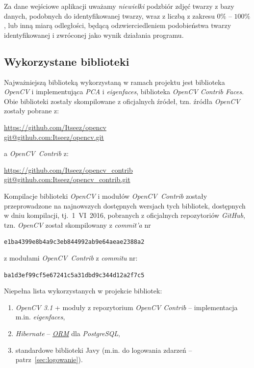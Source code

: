 \documentclass[a4paper,titlepage]{article}
\theoremstyle{break}
\numberwithin{equation}{subsection}
\begin{document}
Za dane wejściowe aplikacji uważamy \emph{niewielki} podzbiór zdjęć twarzy z bazy danych, podobnych do identyfikowanej twarzy, wraz z liczbą z zakresu $0\%$ -- $100\%$, lub inną miarą odległości, będącą odzwierciedleniem podobieństwa twarzy identyfikowanej i zwróconej jako wynik działania programu.


\subsection{Wykorzystane biblioteki}

Najważniejszą biblioteką wykorzystaną w ramach projektu jest biblioteka \emph{OpenCV} i implementująca \emph{PCA} i \emph{eigenfaces}, biblioteka \emph{OpenCV Contrib Faces}. Obie biblioteki zostały skompilowane z oficjalnych źródeł, tzn. źródła \emph{OpenCV} zostały pobrane z:
\begin{center}
\url{https://github.com/Itseez/opencv}\\
\url{git@github.com:Itseez/opencv.git}
\end{center}
a \emph{OpenCV~Contrib} z:
\begin{center}
\url{https://github.com/Itseez/opencv_contrib}\\
\url{git@github.com:Itseez/opencv_contrib.git}
\end{center}
Kompilacje biblioteki \emph{OpenCV} i modułów \emph{OpenCV~Contrib} zostały przeprowadzone na najnowszych dostępnych wersjach tych bibliotek, dostępnych w dniu kompilacji, tj.~1~VI~2016, pobranych z oficjalnych repozytoriów \emph{GitHub}, tzn. \emph{OpenCV} został skompilowany z \emph{commit'a} nr
\begin{center}
\texttt{e1ba4399e8b4a9c3eb844992ab9e64aeae2388a2}
\end{center}
z modułami \emph{OpenCV~Contrib} z \emph{commitu} nr:
\begin{center}
\texttt{ba1d3ef99cf5e67241c5a31dbd9c344d12a2f7c5}
\end{center}

Niepełna lista wykorzystanych w projekcie bibliotek:
\begin{enumerate}
	\item \emph{OpenCV 3.1} + moduły z repozytorium \emph{OpenCV Contrib} -- implementacja m.in. \emph{eigenfaces},
	\item \emph{Hibernate} -- \href{https://en.wikipedia.org/wiki/Object-relational_mapping}{\emph{ORM}} dla \emph{PostgreSQL},
	\item standardowe biblioteki Javy (m.in. do logowania zdarzeń -- patrz~\ref{sec:logowanie}).
\end{enumerate}
\end{document}
